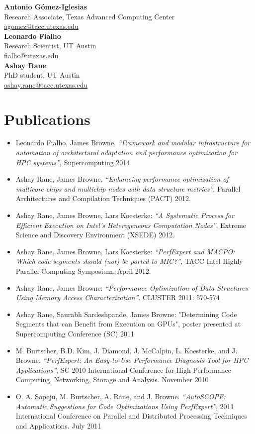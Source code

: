 \noindent\textbf{Antonio G\'{o}mez-Iglesias}\\
Research Associate, Texas Advanced Computing Center\\
\href{mailto:agomez@tacc.utexas.edu}{agomez@tacc.utexas.edu}\\

\noindent\textbf{Leonardo Fialho}\\
Research Scientist, UT Austin\\
\href{mailto:fialho@utexas.edu}{fialho@utexas.edu}\\

\noindent\textbf{Ashay Rane}\\
PhD student, UT Austin\\
\href{mailto:ashay.rane@tacc.utexas.edu}{ashay.rane@tacc.utexas.edu}

\section{Publications}

\begin{itemize}
        \item Leonardo Fialho, James Browne, \textit{``Framework and modular infrastructure for automation of architectural adaptation and performance optimization for HPC systems''}, Supercomputing 2014.
	\item Ashay Rane, James Browne, \textit{``Enhancing performance optimization of multicore chips and multichip nodes with data structure metrics''}, Parallel Architectures and Compilation Techniques (PACT) 2012.
	\item Ashay Rane, James Browne, Lars Koesterke: \textit{``A Systematic Process for Efficient Execution on Intel's Heterogeneous Computation Nodes''}, Extreme Science and Discovery Environment (XSEDE) 2012.
	\item Ashay Rane, James Browne, Lars Koesterke: \textit{``PerfExpert and MACPO: Which code segments should (not) be ported to MIC?''}, TACC-Intel Highly Parallel Computing Symposium, April 2012.
	\item Ashay Rane, James Browne: \textit{``Performance Optimization of Data Structures Using Memory Access Characterization''}. CLUSTER 2011: 570-574
	\item Ashay Rane, Saurabh Sardeshpande, James Browne: "Determining Code Segments that can Benefit from Execution on GPUs", poster presented at Supercomputing Conference (SC) 2011
	\item M. Burtscher, B.D. Kim, J. Diamond, J. McCalpin, L. Koesterke, and J. Browne. \textit{``PerfExpert: An Easy-to-Use Performance Diagnosis Tool for HPC Applications''}, SC 2010 International Conference for High-Performance Computing, Networking, Storage and Analysis. November 2010
	\item O. A. Sopeju, M. Burtscher, A. Rane, and J. Browne. \textit{``AutoSCOPE: Automatic Suggestions for Code Optimizations Using PerfExpert''}, 2011 International Conference on Parallel and Distributed Processing Techniques and Applications. July 2011
\end{itemize}

